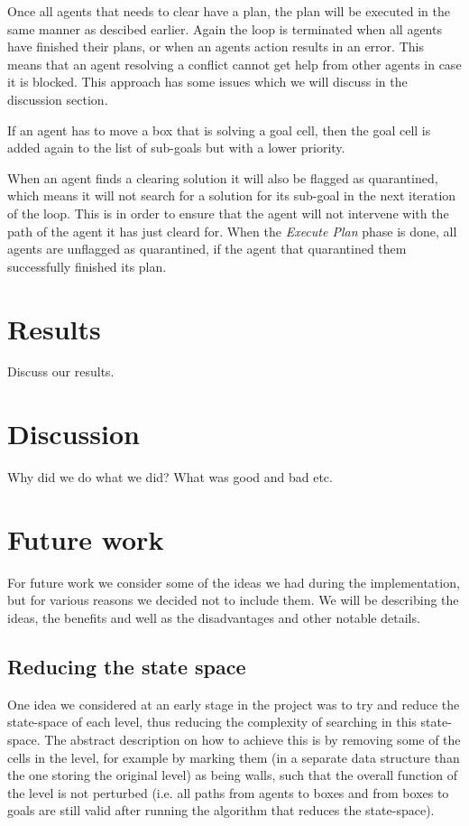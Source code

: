 \documentclass[letterpaper]{article}
\begin{document}
Once all agents that needs to clear have a plan, the plan will be executed in the same manner as descibed earlier. Again the loop is terminated when all agents have finished their plans, or when an agents action results in an error. This means that an agent resolving a conflict cannot get help from other agents in case it is blocked. This approach has some issues which we will discuss in the discussion section.

If an agent has to move a box that is solving a goal cell, then the goal cell is added again to the list of sub-goals but with a lower priority.

When an agent finds a clearing solution it will also be flagged as quarantined, which means it will not search for a solution for its sub-goal in the next iteration of the loop. This is in order to ensure that the agent will not intervene with the path of the agent it has just cleard for. When the \textit{Execute Plan} phase is done, all agents are unflagged as quarantined, if the agent that quarantined them successfully finished its plan. 


\section{Results}
Discuss our results.

\section{Discussion}
Why did we do what we did? What was good and bad etc.

\section{Future work}
For future work we consider some of the ideas we had during the implementation, but for various reasons we decided not to include them. We will be describing the ideas, the benefits and well as the disadvantages and other notable details.

\subsection{Reducing the state space}
One idea we considered at an early stage in the project was to try and reduce the state-space of each level, thus reducing the complexity of searching in this state-space. The abstract description on how to achieve this is by removing some of the cells in the level, for example by marking them (in a separate data structure than the one storing the original level) as being walls, such that the overall function of the level is not perturbed (i.e. all paths from agents to boxes and from boxes to goals are still valid after running the algorithm that reduces the state-space).
\end{document}

